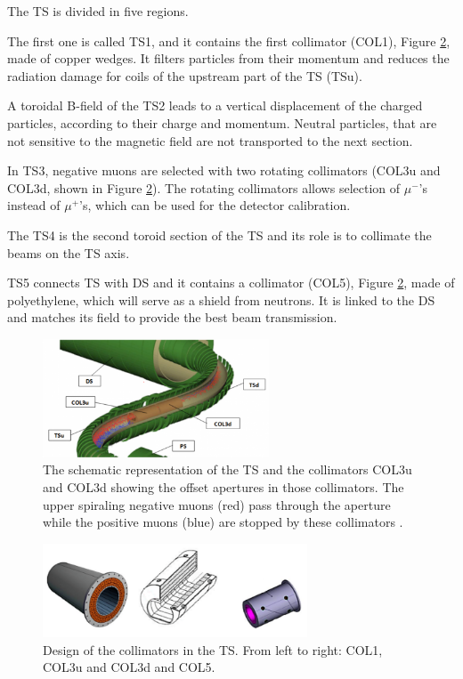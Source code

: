 The TS is divided in five regions. 

The first one is called TS1, and it contains the first collimator (COL1), 
Figure \ref{fig:collimatorsshape}, made of copper wedges. 
It filters particles from their momentum and reduces the 
radiation damage for coils of the 
upstream part of the TS (TSu). 

A toroidal B-field of the TS2 leads to a vertical displacement of the charged particles,
according to their charge and momentum. Neutral particles, that are not sensitive to the magnetic 
field are not transported to the next section.


In TS3, negative muons are selected with two rotating 
collimators (COL3u and COL3d,  shown in Figure \ref{fig:collimatorsshape}). 
The rotating collimators allows selection
of $\mu^-$'s instead of $\mu^+$'s, which can be used for the detector calibration. 

The TS4 is the second toroid section of the TS and its role is 
to collimate the beams on the TS axis.

TS5 connects TS with DS and it contains a collimator (COL5), 
Figure \ref{fig:collimatorsshape}, made of polyethylene, 
which will serve as a shield from neutrons.
It is linked to the DS 
and matches its field to provide the best beam transmission.


\begin{figure}[!h]
    \centering
    \includegraphics[width =0.6\textwidth]{figures/png/800px-MuonBeamlineCollimators2.png}
    \caption[The Transport Solenoid and the collimators.]{The schematic representation of the TS and the collimators COL3u and 
    COL3d showing the offset apertures in those collimators. The 
    upper spiraling negative muons (red) pass through the aperture while 
    the positive muons (blue) are stopped by these collimators \cite{tsview}.}
    \label{fig:collimators}
    \end{figure}
    \begin{figure}[!h]
        \centering
        \includegraphics[width =0.7\textwidth]{figures/png/Screenshot_20240706_120535.png}
        \caption[The design of the collimators in the TS.]{Design of the collimators in the TS. From left to right: COL1, COL3u and COL3d
        and COL5.}
        \label{fig:collimatorsshape}
        \end{figure}

